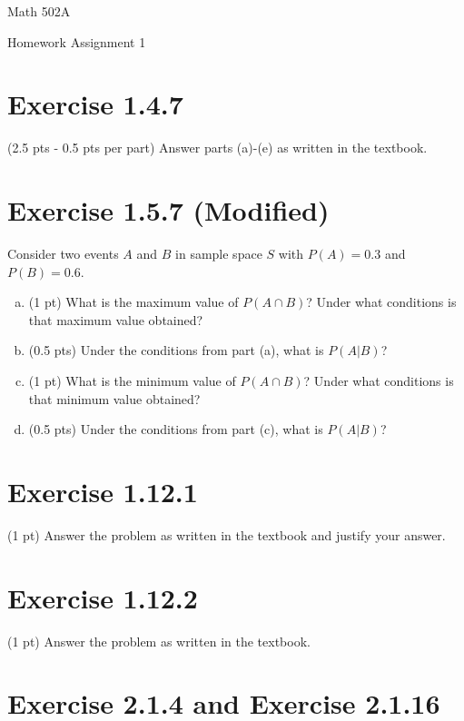 \documentclass{article}
\begin{document}
\begin{center}
{\Huge {Math 502A}}

\vspace{0.2in}

{\Large {Homework Assignment 1}}
\end{center}

\vspace{0.1in}

\section{Exercise 1.4.7}
(2.5 pts - 0.5 pts per part) Answer parts (a)-(e) as written in the textbook.

\section{Exercise 1.5.7 (Modified)}

Consider two events $A$ and $B$ in sample space $S$ with $P(A) = 0.3$ and $P(B) = 0.6$.

\begin{enumerate}[(a)]
\item (1 pt) What is the maximum value of $P(A \cap B)$? Under what conditions is that maximum value obtained?
\item (0.5 pts) Under the conditions from part (a), what is $P(A | B)$?
\item (1 pt) What is the minimum value of $P(A \cap B)$? Under what conditions is that minimum value obtained?
\item (0.5 pts) Under the conditions from part (c), what is $P(A | B)$?
\end{enumerate}

\section{Exercise 1.12.1}
(1 pt) Answer the problem as written in the textbook and justify your answer.

\section{Exercise 1.12.2}
(1 pt) Answer the problem as written in the textbook.

\section{Exercise 2.1.4 and Exercise 2.1.16}
\end{document}
